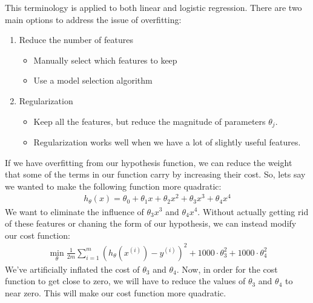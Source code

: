 \documentclass{article}
\begin{document}
            This terminology is applied to both linear and logistic regression. There are two main options to address the issue of overfitting:
        
            \begin{enumerate}
                \item Reduce the number of features
                    \begin{itemize}
                        \item Manually select which features to keep
                        \item Use a model selection algorithm        
                    \end{itemize}
                \item Regularization
                    \begin{itemize}
                        \item Keep all the features, but reduce the magnitude of parameters $\theta_j$.
                        \item Regularization works well when we have a lot of slightly useful features.      
                    \end{itemize}
            \end{enumerate}

            If we have overfitting from our hypothesis function, we can reduce the weight that some of the terms in our function carry by increasing their cost.
            So, lets say we wanted to make the following function more quadratic:
            \begin{align*}
                 h_{\theta}(x)= \theta_{0} + \theta_{1}x + \theta_{2}x^2 + \theta_{3}x^3 + \theta_{4}x^4
            \end{align*}
            We want to eliminate the influence of $\theta_3x^3$ and $\theta_4x^4$. Without actually getting rid of these features or chaning the form
            of our hypothesis, we can instead modify our cost function:
            \begin{align*}
                \min_{\theta}\frac{1}{2m}\sum_{i=1}^m(h_{\theta}(x^{(i)})-y^{(i)})^2 + 1000\cdot\theta_3^2 + 1000\cdot\theta_4^2
            \end{align*}
            We've artificially inflated the cost of $\theta_3$ and $\theta_4$.
            Now, in order for the cost function to get close to zero, we will have to reduce the values of
            $\theta_3$ and $\theta_4$ to near zero. This will make our cost function more quadratic.
\end{document}

